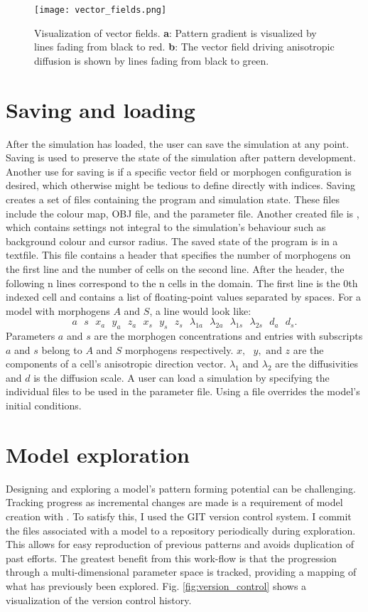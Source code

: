 \begin{figure}[ht]
	\centering
	\texttt{[image: vector\_fields.png]}	
	\caption[Visualization of vector fields]{Visualization of vector fields. \textbf{a}: Pattern gradient is visualized by lines fading from black to red. \textbf{b}: The vector field driving anisotropic diffusion is shown by lines fading from black to green.} 
	\label{fig:vector_fields}
\end{figure}

\section{Saving and loading}
After the simulation has loaded, the user can save the simulation at any point. Saving is used to preserve the state of the simulation after pattern development. Another use for saving is if a specific vector field or morphogen configuration is desired, which otherwise might be tedious to define directly with indices. Saving creates a set of files containing the program and simulation state. These files include the colour map, OBJ file, and the parameter file. Another created file is , which contains settings not integral to the simulation's behaviour such as background colour and cursor radius. The saved state of the program is in a  textfile. This file contains a header that specifies the number of morphogens on the first line and the number of cells on the second line. After the header, the following n lines correspond to the n cells in the domain. The first line is the 0th indexed cell and contains a list of floating-point values separated by spaces. For a model with morphogens $A$ and $S$, a line would look like:
\[a\text{ }s\text{ }x_a\text{ }y_a\text{ }z_a\text{ }x_s\text{ }y_s\text{ }z_s\text{ }\lambda_{1a}\text{ }\lambda_{2a}\text{ }\lambda_{1s}\text{ }\lambda_{2s}\text{ }d_a\text{ }d_s.\]
Parameters $a$ and $s$ are the morphogen concentrations and entries with subscripts $a$ and $s$ belong to $A$ and $S$ morphogens respectively. $x,\text{ }y, \text{ and } z$ are the components of a cell's anisotropic direction vector. $\lambda_1$ and $\lambda_2$ are the diffusivities and $d$ is the diffusion scale. A user can load a simulation by specifying the individual files to be used in the parameter file. Using a  file overrides the model's initial conditions.

\section{Model exploration}
Designing and exploring a model's pattern forming potential can be challenging. Tracking progress as incremental changes are made is a requirement of model creation with \ProgramName{}. To satisfy this, I used the GIT version control system. I commit the files associated with a model to a repository periodically during exploration. This allows for easy reproduction of previous patterns and avoids duplication of past efforts. The greatest benefit from this work-flow is that the progression through a multi-dimensional parameter space is tracked, providing a mapping of what has previously been explored. Fig. \ref{fig:version_control} shows a visualization of the version control history.

